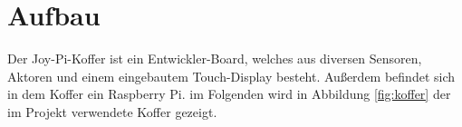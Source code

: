 \section{Aufbau}
Der Joy-Pi-Koffer ist ein Entwickler-Board, welches aus diversen Sensoren, Aktoren und einem eingebautem Touch-Display besteht. Außerdem befindet sich in dem Koffer ein Raspberry Pi. im Folgenden wird in Abbildung \ref{fig:koffer} der im Projekt verwendete Koffer gezeigt.
\begin{figure}[H] %
\end{figure} %
